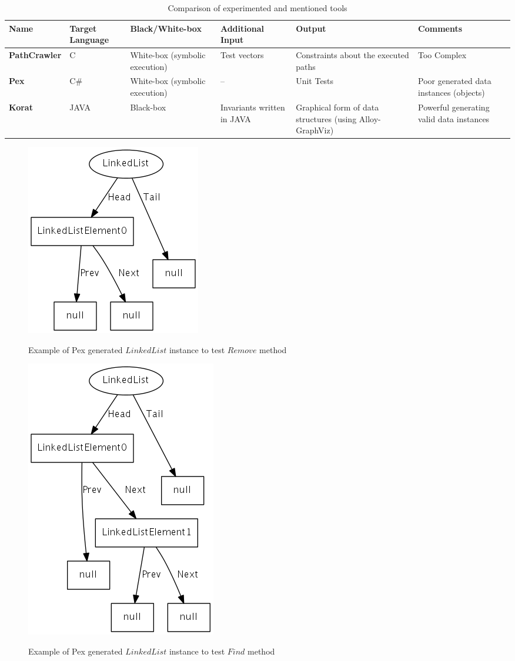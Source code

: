\begin{table}[!ht]
\centering
\begin{tabular}{|m{2cm}|m{2cm}|m{2cm}|m{2cm}|m{2cm}|m{2cm}|}\hline
Name & Target Language & Black/White-box & Additional Input & Output & Comments\\\hline
\textbf{PathCrawler} & C & White-box (symbolic execution) & Test vectors & Constraints about the executed paths & Too Complex\\\hline
\textbf{Pex} & C\# & White-box (symbolic execution) & -- & Unit Tests & Poor generated data instances (objects)\\\hline
\textbf{Korat} & JAVA & Black-box & Invariants written in JAVA & Graphical form of data structures (using Alloy-GraphViz) & Powerful generating valid data instances\\\hline
\end{tabular}
\caption{Comparison of experimented and mentioned tools}
\label{tab:tabcmp}
\end{table}

\begin{figure}[!ht]
\center \includegraphics[width=.3\textwidth]{images/pex1}
\label{fig:pexinst1}
\caption{Example of Pex generated $LinkedList$ instance to test $Remove$ method}
\end{figure}

\begin{figure}[!ht]
\center \includegraphics[width=.3\textwidth]{images/pex2}
\label{fig:pexinst2}
\caption{Example of Pex generated $LinkedList$ instance to test $Find$ method}
\end{figure}

